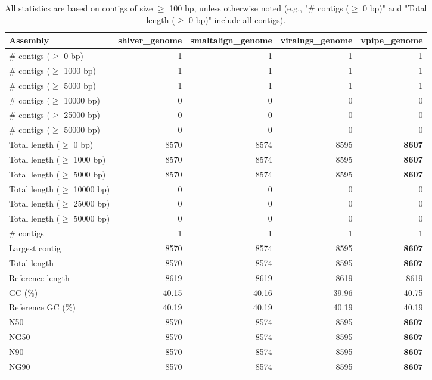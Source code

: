 \documentclass[12pt,a4paper]{article}
\begin{document}
\begin{table}[ht]
\begin{center}
\caption{All statistics are based on contigs of size $\geq$ 100 bp, unless otherwise noted (e.g., "\# contigs ($\geq$ 0 bp)" and "Total length ($\geq$ 0 bp)" include all contigs).}
\begin{tabular}{|l*{4}{|r}|}
\hline
Assembly & shiver\_genome & smaltalign\_genome & viralngs\_genome & vpipe\_genome \\ \hline
\# contigs ($\geq$ 0 bp) & 1 & 1 & 1 & 1 \\ \hline
\# contigs ($\geq$ 1000 bp) & 1 & 1 & 1 & 1 \\ \hline
\# contigs ($\geq$ 5000 bp) & 1 & 1 & 1 & 1 \\ \hline
\# contigs ($\geq$ 10000 bp) & 0 & 0 & 0 & 0 \\ \hline
\# contigs ($\geq$ 25000 bp) & 0 & 0 & 0 & 0 \\ \hline
\# contigs ($\geq$ 50000 bp) & 0 & 0 & 0 & 0 \\ \hline
Total length ($\geq$ 0 bp) & 8570 & 8574 & 8595 & {\bf 8607} \\ \hline
Total length ($\geq$ 1000 bp) & 8570 & 8574 & 8595 & {\bf 8607} \\ \hline
Total length ($\geq$ 5000 bp) & 8570 & 8574 & 8595 & {\bf 8607} \\ \hline
Total length ($\geq$ 10000 bp) & 0 & 0 & 0 & 0 \\ \hline
Total length ($\geq$ 25000 bp) & 0 & 0 & 0 & 0 \\ \hline
Total length ($\geq$ 50000 bp) & 0 & 0 & 0 & 0 \\ \hline
\# contigs & 1 & 1 & 1 & 1 \\ \hline
Largest contig & 8570 & 8574 & 8595 & {\bf 8607} \\ \hline
Total length & 8570 & 8574 & 8595 & {\bf 8607} \\ \hline
Reference length & 8619 & 8619 & 8619 & 8619 \\ \hline
GC (\%) & 40.15 & 40.16 & 39.96 & 40.75 \\ \hline
Reference GC (\%) & 40.19 & 40.19 & 40.19 & 40.19 \\ \hline
N50 & 8570 & 8574 & 8595 & {\bf 8607} \\ \hline
NG50 & 8570 & 8574 & 8595 & {\bf 8607} \\ \hline
N90 & 8570 & 8574 & 8595 & {\bf 8607} \\ \hline
NG90 & 8570 & 8574 & 8595 & {\bf 8607} \\ \hline

\end{tabular}
\end{center}
\end{table}
\end{document}
